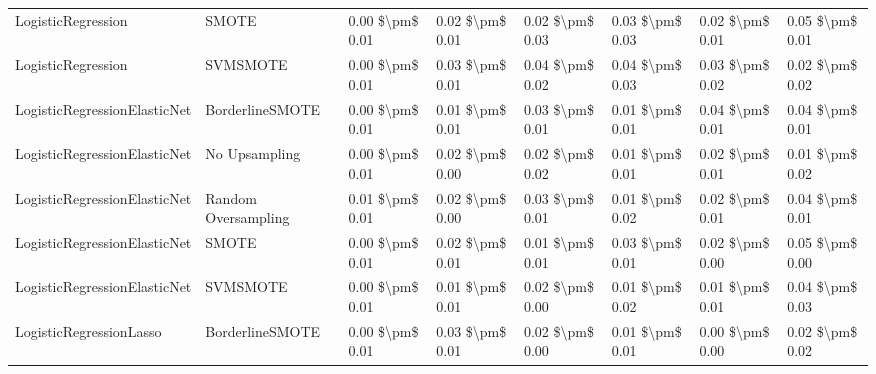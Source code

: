\begin{tabular}{llllllll}
             LogisticRegression &                         SMOTE & 0.00 \$\textbackslash pm\$ 0.01 &           0.02 \$\textbackslash pm\$ 0.01 &       0.02 \$\textbackslash pm\$ 0.03 &        0.03 \$\textbackslash pm\$ 0.03 &                         0.02 \$\textbackslash pm\$ 0.01 &     0.05 \$\textbackslash pm\$ 0.01 \\
             LogisticRegression &                      SVMSMOTE & 0.00 \$\textbackslash pm\$ 0.01 &           0.03 \$\textbackslash pm\$ 0.01 &       0.04 \$\textbackslash pm\$ 0.02 &        0.04 \$\textbackslash pm\$ 0.03 &                         0.03 \$\textbackslash pm\$ 0.02 &     0.02 \$\textbackslash pm\$ 0.02 \\
   LogisticRegressionElasticNet &               BorderlineSMOTE & 0.00 \$\textbackslash pm\$ 0.01 &           0.01 \$\textbackslash pm\$ 0.01 &       0.03 \$\textbackslash pm\$ 0.01 &        0.01 \$\textbackslash pm\$ 0.01 &                         0.04 \$\textbackslash pm\$ 0.01 &     0.04 \$\textbackslash pm\$ 0.01 \\
   LogisticRegressionElasticNet &                 No Upsampling & 0.00 \$\textbackslash pm\$ 0.01 &           0.02 \$\textbackslash pm\$ 0.00 &       0.02 \$\textbackslash pm\$ 0.02 &        0.01 \$\textbackslash pm\$ 0.01 &                         0.02 \$\textbackslash pm\$ 0.01 &     0.01 \$\textbackslash pm\$ 0.02 \\
   LogisticRegressionElasticNet &           Random Oversampling & 0.01 \$\textbackslash pm\$ 0.01 &           0.02 \$\textbackslash pm\$ 0.00 &       0.03 \$\textbackslash pm\$ 0.01 &        0.01 \$\textbackslash pm\$ 0.02 &                         0.02 \$\textbackslash pm\$ 0.01 &     0.04 \$\textbackslash pm\$ 0.01 \\
   LogisticRegressionElasticNet &                         SMOTE & 0.00 \$\textbackslash pm\$ 0.01 &           0.02 \$\textbackslash pm\$ 0.01 &       0.01 \$\textbackslash pm\$ 0.01 &        0.03 \$\textbackslash pm\$ 0.01 &                         0.02 \$\textbackslash pm\$ 0.00 &     0.05 \$\textbackslash pm\$ 0.00 \\
   LogisticRegressionElasticNet &                      SVMSMOTE & 0.00 \$\textbackslash pm\$ 0.01 &           0.01 \$\textbackslash pm\$ 0.01 &       0.02 \$\textbackslash pm\$ 0.00 &        0.01 \$\textbackslash pm\$ 0.02 &                         0.01 \$\textbackslash pm\$ 0.01 &     0.04 \$\textbackslash pm\$ 0.03 \\
        LogisticRegressionLasso &               BorderlineSMOTE & 0.00 \$\textbackslash pm\$ 0.01 &           0.03 \$\textbackslash pm\$ 0.01 &       0.02 \$\textbackslash pm\$ 0.00 &        0.01 \$\textbackslash pm\$ 0.01 &                         0.00 \$\textbackslash pm\$ 0.00 &     0.02 \$\textbackslash pm\$ 0.02 \\

\end{tabular}
